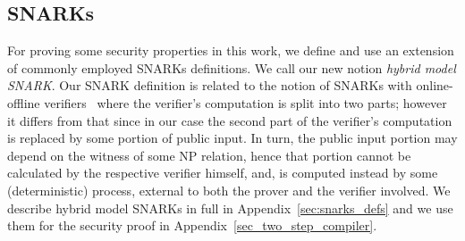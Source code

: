 \subsection{SNARKs}
\label{sec:short_snarks_defs}
\noindent For proving some security properties in this work, we define and use an extension of commonly employed SNARKs definitions. We call our new notion \emph{hybrid model SNARK}. 
Our SNARK definition is related to the notion of SNARKs with online-offline verifiers~\cite{HP_paper} where the verifier's computation 
is split into two parts; however it differs from that since in our case the second part of the verifier's computation is replaced by some portion of public input. 
In turn, the public input portion may depend on the witness of some NP relation, hence that portion cannot be calculated by the respective verifier himself, and, is computed instead by some (deterministic) process, external to both the prover and the verifier involved. We describe hybrid model SNARKs in full in Appendix~\ref{sec:snarks_defs} and we use them for the security proof in Appendix~\ref{sec_two_step_compiler}.




